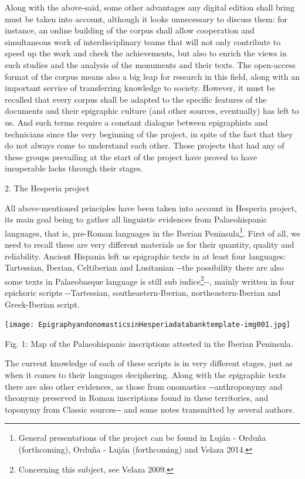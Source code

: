 \documentclass[amsthm,ebook]{saparticle}
\begin{document}
Along with the above-said, some other advantages any digital edition shall bring must be taken into account, although it
looks unnecessary to discuss them: for instance, an online building of the corpus shall allow cooperation and
simultaneous work of interdisciplinary teams that will not only contribute to speed up the work and check the
achievements, but also to enrich the views in such studies and the analysis of the monuments and their texts. The
open-access format of the corpus means also a big leap for research in this field, along with an important service of
transferring knowledge to society. However, it must be recalled that every corpus shall be adapted to the specific
features of the documents and their epigraphic culture (and other sources, eventually) has left to us. And such terms
require a constant dialogue between epigraphists and technicians since the very beginning of the project, in spite of
the fact that they do not always come to understand each other. Those projects that had any of these groups prevailing
at the start of the project have proved to have insuperable lacks through their stages. 

2. The Hesperia project

All above-mentioned principles have been taken into account in Hesperia project, its main goal being to gather all
linguistic evidences from Palaeohispanic languages, that is, pre-Roman languages in the Iberian Peninsula\footnote{
General presentations of the project can be found in Luján - Orduña (forthcoming), Orduña - Luján (forthcoming) and
Velaza 2014.}. First of all, we need to recall these are very different materials as for their quantity, quality and
reliability. Ancient Hispania left us epigraphic texts in at least four languages: Tartessian, Iberian, Celtiberian and
Lusitanian -{}-the possibility there are also some texts in Palaeobasque language is still sub iudice\footnote{
Concerning this subject, see Velaza 2009.}{}-{}-, mainly written in four epichoric scripts -{}-Tartessian,
southeastern-Iberian, northeastern-Iberian and Greek-Iberian script. 

 \texttt{[image: EpigraphyandonomasticsinHesperiadatabanktemplate-img001.jpg]} 

Fig. 1: Map of the Palaeohispanic inscriptions attested in the Iberian Peninsula.

The current knowledge of each of these scripts is in very different stages, just as when it comes to their languages
deciphering. Along with the epigraphic texts there are also other evidences, as those from onomastics -{}-anthroponymy
and theonymy preserved in Roman inscriptions found in these territories, and toponymy from Classic sources-{}- and some
notes transmitted by several authors. 
\end{document}
